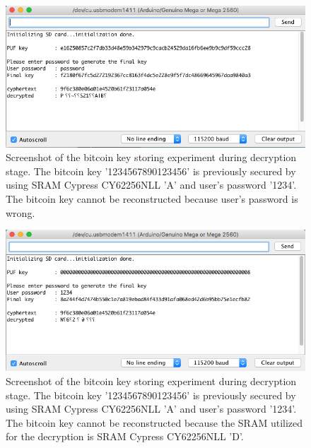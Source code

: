 \begin{figure}[tph!]
    \centerline{\includegraphics[width={\textwidth}]{images/A_decrypt_wrong_password}}
    \caption{Screenshot of the bitcoin key storing experiment during decryption stage. The bitcoin key '1234567890123456' is previously secured by using SRAM Cypress CY62256NLL 'A' and user's password '1234'.
    The bitcoin key cannot be reconstructed because user's password is wrong.}
    \label{fig:A_decrypt_wrong_password}
\end{figure}

\begin{figure}[tph!]
    \centerline{\includegraphics[width={\textwidth}]{images/A_decrypt_wrong_SRAM_D}}
    \caption{Screenshot of the bitcoin key storing experiment during decryption stage. The bitcoin key '1234567890123456' is previously secured by using SRAM Cypress CY62256NLL 'A' and user's password '1234'.
    The bitcoin key cannot be reconstructed because the SRAM utilized for the decryption is SRAM Cypress CY62256NLL 'D'.}
    \label{fig:A_decrypt_wrong_SRAM}
\end{figure}

